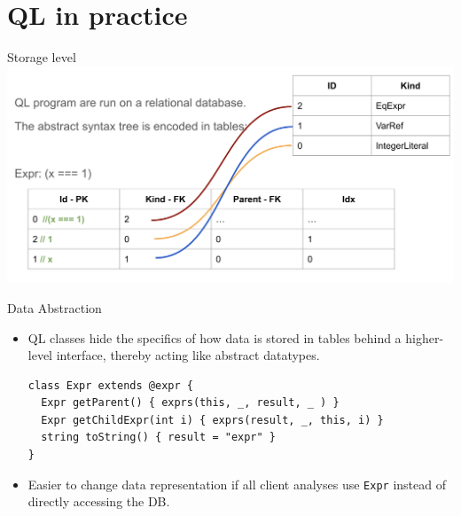 \documentclass[usenames,dvipsnames]{beamer}
\begin{document}
\section{QL in practice}
\begin{frame}{Storage level}
\includegraphics[scale=0.28]{img/storage}
\end{frame}

\begin{frame}[fragile]{Data Abstraction}
\begin{itemize}
\item QL classes hide the specifics of how data is stored in tables behind a higher-level interface, thereby acting like abstract datatypes.
\begin{lstlisting}[language=JastAdd]
class Expr extends @expr {
  Expr getParent() { exprs(this, _, result, _ ) }
  Expr getChildExpr(int i) { exprs(result, _, this, i) }
  string toString() { result = "expr" }
}
\end{lstlisting}
\item Easier to change data representation if all client analyses use \texttt{Expr} instead of directly accessing the DB.
\end{itemize}
\end{frame}
\end{document}
